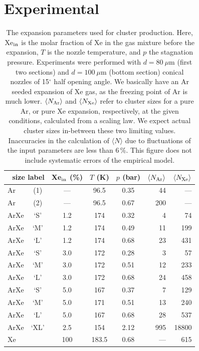 \documentclass[journal=jpccck,manuscript=article]{achemso}
\begin{document}
\section{Experimental}
%
\begin{table}
\caption{
The expansion parameters used for cluster production. 
Here, Xe$_{\rm in}$ is the molar fraction of Xe in the gas mixture before the expansion, $T$ is the nozzle temperature, and $p$ the stagnation pressure. 
Experiments were performed with $d = 80~\mu$m (first two sections) and $d = 100~\mu$m (bottom section) conical nozzles of 15$^\circ$ half opening angle. 
We basically have an Ar seeded expansion of Xe gas, as the freezing point of Ar is much lower. 
$\langle N_{\rm Ar} \rangle$ and $\langle N_{\rm Xe} \rangle$ refer to cluster sizes for a pure Ar, or pure Xe expansion, respectively, at the given conditions, calculated from a scaling law.\protect\cite{Hagena1992}
We expect actual cluster sizes in-between these two limiting values. 
Inaccuracies in the calculation of $\langle N\rangle$ due to fluctuations of the input parameters are less than 6\,\%. This figure does not include systematic errors of the empirical model.
}
\label{tab:cluster}

\begin{tabular}{l c c c c r r}
%
\toprule
  \multicolumn{2}{r}{size label}  &  Xe$_{\rm in}$ (\%)  &  $T$ (K)  &  $p$ (bar) & $\langle N_{\rm Ar} \rangle$ & $\langle N_{\rm Xe} \rangle$ \\
%
\midrule
Ar & (1) & --- &  96.5  & 0.35  & 44  &  --- \\
Ar & (2) & --- &  96.5  & 0.67  & 200  &  --- \\
\midrule
ArXe & `S' & 1.2 &  174   & 0.32  & 4  &   74 \\
ArXe & `M' & 1.2 &  174   & 0.49  & 11  &  199 \\
ArXe & `L' & 1.2 &  174   & 0.68  & 23  &  431 \\
\midrule
ArXe & `S' & 3.0 &  172   & 0.28  & 3  &   57 \\
ArXe & `M' & 3.0 &  172   & 0.51  & 12  &  233 \\
ArXe & `L' & 3.0 &  172   & 0.68  & 24  &  458 \\
\midrule
ArXe & `S'  & 5.0 &  167  & 0.37  & 7  &  129 \\
ArXe & `M' & 5.0 &  171   & 0.51  & 13  &  240 \\
ArXe & `L'  & 5.0 &  167  & 0.68  & 28  &  537 \\
\midrule
ArXe & `XL' & 2.5 &  154  & 2.12  & 995 & 18800\\
\midrule
Xe &  & 100 & 183.5  & 0.68  & ---  &  615 \\     
%
\bottomrule
\end{tabular}
\end{table}
\end{document}
